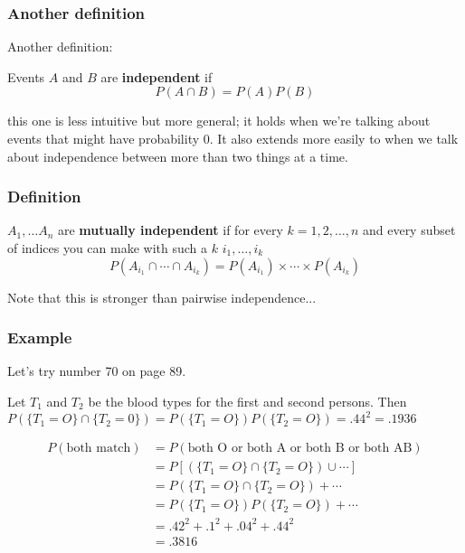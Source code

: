 \documentclass{beamer}
\begin{document}


\begin{frame}
\frametitle{Another definition}

Another definition:
\newline

Events $A$ and $B$ are \textbf{independent} if 
\[
P(A \cap B) = P(A)P(B)
\]

this one is less intuitive but more general; it holds when we're talking about events that might have probability $0$. It also extends more easily to when we talk about independence between more than two things at a time. 


\end{frame}



\begin{frame}
\frametitle{Definition}

$A_1, \ldots A_n$ are \textbf{mutually independent} if for every $k = 1, 2, \ldots, n$ and every subset of indices you can make with such a $k$ $i_1, \ldots, i_k$
\[
P(A_{i_1} \cap \cdots \cap A_{i_k}) = P(A_{i_1}) \times \cdots \times P(A_{i_k})
\]
\pause

Note that this is stronger than pairwise independence...


\end{frame}



\begin{frame}
\frametitle{Example}

Let's try number 70 on page 89.
\pause
\newline

Let $T_1$ and $T_2$ be the blood types for the first and second persons. Then $P(\{T_1=O\} \cap \{T_2=0\}) = P(\{T_1=O\}) P(\{T_2=O\})= .44^2 = .1936$
\pause
\newline


\begin{align*}
P(\text{both match}) &= P(\text{both O or both A or both B or both AB})\\
&= P\left[ (\{T_1 = O\} \cap \{T_2 = O\}) \cup  \cdots \right] \\
&= P(\{T_1 = O\} \cap \{T_2 = O\}) + \cdots  \\
&= P(\{T_1 = O\}) P(\{T_2 = O\}) + \cdots \\
&= .42^2 + .1^2 + .04^2 + .44^2 \\
&= .3816
\end{align*}

\end{frame}


\end{document}
